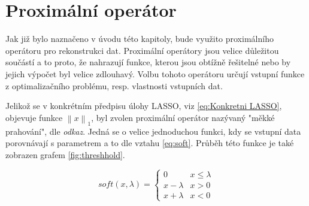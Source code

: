 \documentclass[FM,BP]{tulthesis}
\newcounter{Vzorce}
\begin{document}
\section{Proximální operátor}
Jak již bylo naznačeno v úvodu této kapitoly, bude využito proximálního operátoru pro rekonstrukci dat. Proximální operátory jsou velice důležitou součástí a to proto, že nahrazují funkce, kterou jsou obtížně řešitelné nebo by jejich výpočet byl velice zdlouhavý. Volbu tohoto operátoru určují vstupní funkce z optimalizačního problému, resp. vlastnosti vstupních dat. 

Jelikož se v konkrétním předpisu úlohy LASSO, viz \ref{eq:Konkretni LASSO}, objevuje funkce $\left\| x\right\| _1$, byl zvolen proximální operátor nazývaný "měkké prahování", dle \textit{odkaz}. Jedná se o velice jednoduchou funkci, kdy se vstupní data porovnávají s parametrem a to dle vztahu \ref{eq:soft}. Průběh této funkce je také zobrazen grafem \ref{fig:threshhold}.

\begin{equation} \label{eq:soft} \tag{Vzorec \theVzorce}
soft(x, \lambda) = \begin{cases}
0  & x \leq \lambda\\
x - \lambda & x > 0\\
x + \lambda & x < 0
\end{cases}
\end{equation}
 
\end{document}
